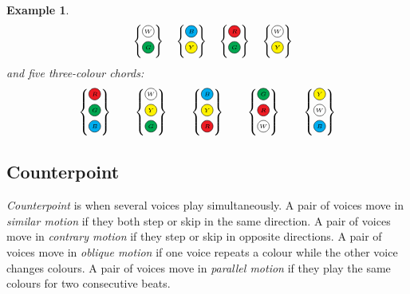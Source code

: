 \documentclass{scrartcl}
\newcommand{\RRR}{
  \begin{tikzpicture}
    \node[circle, draw, fill=Red, inner sep= 0pt, text width=1em, align=center] (n) at (0,0) {$\scriptscriptstyle R$};
  \end{tikzpicture}
}
\newcommand{\WWW}{
  \begin{tikzpicture}
    \node[circle, draw, fill=White,  inner sep= 0pt, text width=1em, align=center] (n) at (0,0) {$\scriptscriptstyle W$};
  \end{tikzpicture}
}
\newcommand{\BBB}{
  \begin{tikzpicture}
    \node[circle, draw, fill=Cyan,  inner sep= 0pt, text width=1em, align=center] (n) at (0,0) {$\scriptscriptstyle B$};
  \end{tikzpicture}
}
\newcommand{\GGG}{
  \begin{tikzpicture}
    \node[circle, draw, fill=Green,  inner sep= 0pt, text width=1em, align=center] (n) at (0,0) {$\scriptscriptstyle G$};
  \end{tikzpicture}
}
\newcommand{\YYY}{
  \begin{tikzpicture}
    \node[circle, draw, fill=Yellow,  inner sep= 0pt, text width=1em, align=center] (n) at (0,0) {$\scriptscriptstyle Y$};
  \end{tikzpicture}
}
\newtheorem{example}{Example}
\numberwithin{example}{section}
\begin{document}
\begin{example}
\begin{equation}
\quad
\begin{Bmatrix}
\WWW \\ \GGG
\end{Bmatrix}
\quad
\begin{Bmatrix}
\BBB \\ \YYY
\end{Bmatrix}
\quad
\begin{Bmatrix}
\RRR \\ \GGG
\end{Bmatrix}
\quad
\begin{Bmatrix}
\WWW \\ \YYY
\end{Bmatrix}
\end{equation}
and five three-colour chords:
\begin{equation}\nonumber
\begin{Bmatrix}
\RRR \\ \GGG \\ \BBB
\end{Bmatrix}
\qquad
\begin{Bmatrix}
\WWW \\ \YYY \\ \GGG
\end{Bmatrix}
\qquad
\begin{Bmatrix}
\BBB \\ \YYY \\ \RRR
\end{Bmatrix}
\qquad
\begin{Bmatrix}
\GGG \\ \RRR \\ \WWW
\end{Bmatrix}
\qquad
\begin{Bmatrix}
\YYY \\ \WWW \\ \BBB
\end{Bmatrix}
\end{equation}
\end{example}

\subsection{Counterpoint}
\emph{Counterpoint} is when several voices play simultaneously.
A pair of voices move in \emph{similar motion} if they both step or skip in the same direction.
A pair of voices move in \emph{contrary motion} if they step or skip in opposite directions. 
A pair of voices move in \emph{oblique motion} if one voice repeats a colour while the other voice changes colours. 
A pair of voices move in \emph{parallel motion} if they play the same colours for two consecutive beats.
\end{document}
